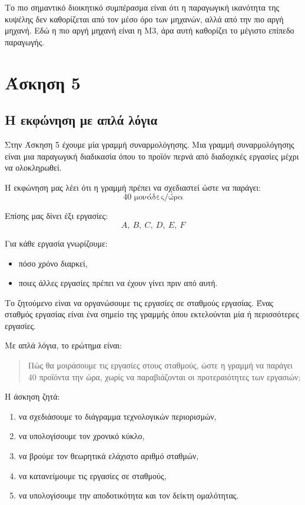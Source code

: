 \documentclass[12pt,a4paper]{article}
\begin{document}
Το πιο σημαντικό διοικητικό συμπέρασμα είναι ότι η παραγωγική ικανότητα της κυψέλης δεν καθορίζεται από τον μέσο όρο των μηχανών, αλλά από την πιο αργή μηχανή. Εδώ η πιο αργή μηχανή είναι η Μ3, άρα αυτή καθορίζει το μέγιστο επίπεδο παραγωγής.

\newpage

\section{Άσκηση 5}

\subsection{Η εκφώνηση με απλά λόγια}

Στην Άσκηση 5 έχουμε μία γραμμή συναρμολόγησης. Μια γραμμή συναρμολόγησης είναι μια παραγωγική διαδικασία όπου το προϊόν περνά από διαδοχικές εργασίες μέχρι να ολοκληρωθεί.

Η εκφώνηση μας λέει ότι η γραμμή πρέπει να σχεδιαστεί ώστε να παράγει:
\[
40 \text{ μονάδες/ώρα}
\]

Επίσης μας δίνει έξι εργασίες:
\[
A,\ B,\ C,\ D,\ E,\ F
\]

Για κάθε εργασία γνωρίζουμε:

\begin{itemize}
    \item πόσο χρόνο διαρκεί,
    \item ποιες άλλες εργασίες πρέπει να έχουν γίνει πριν από αυτή.
\end{itemize}

Το ζητούμενο είναι να οργανώσουμε τις εργασίες σε σταθμούς εργασίας. Ένας σταθμός εργασίας είναι ένα σημείο της γραμμής όπου εκτελούνται μία ή περισσότερες εργασίες.

Με απλά λόγια, το ερώτημα είναι:

\begin{quote}
Πώς θα μοιράσουμε τις εργασίες στους σταθμούς, ώστε η γραμμή να παράγει 40 προϊόντα την ώρα, χωρίς να παραβιάζονται οι προτεραιότητες των εργασιών;
\end{quote}

Η άσκηση ζητά:

\begin{enumerate}
    \item να σχεδιάσουμε το διάγραμμα τεχνολογικών περιορισμών,
    \item να υπολογίσουμε τον χρονικό κύκλο,
    \item να βρούμε τον θεωρητικά ελάχιστο αριθμό σταθμών,
    \item να κατανείμουμε τις εργασίες σε σταθμούς,
    \item να υπολογίσουμε την αποδοτικότητα και τον δείκτη ομαλότητας.
\end{enumerate}
\end{document}

